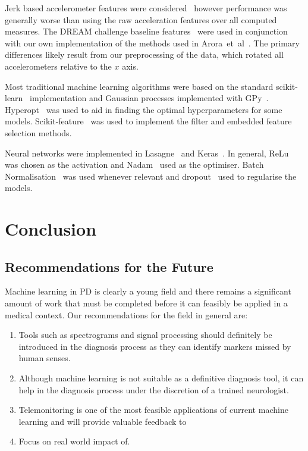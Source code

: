 \documentclass[12pt, twoside]{book}
\begin{document}
Jerk based accelerometer features were considered~\cite{jerkfeature} however performance was generally worse than using the raw acceleration features over all computed measures. The DREAM challenge baseline features~\cite{mpowertools} were used in conjunction with our own implementation of the methods used in Arora~et~al~\cite{arora2014high}. The primary differences likely result from our preprocessing of the data, which rotated all accelerometers relative to the $x$ axis.


Most traditional machine learning algorithms were based on the standard scikit-learn~\cite{scikitlearn} implementation and Gaussian processes implemented with GPy~\cite{gpy2014}. Hyperopt~\cite{hyperopt} was used to aid in finding the optimal hyperparameters for some models. Scikit-feature~\cite{skfeature} was used to implement the filter and embedded feature selection methods. 

Neural networks were implemented in Lasagne~\cite{lasagne} and Keras~\cite{keras}. In general, ReLu~\cite{relu} was chosen as the activation and Nadam~\cite{nadam} used as the optimiser. Batch Normalisation~\cite{batchnorm} was used whenever relevant and dropout~\cite{dropout} used to regularise the models. 



\chapter{Conclusion}



\section{Recommendations for the Future}
Machine learning in PD is clearly a young field and there remains a significant amount of work that must be completed before it can feasibly be applied in a medical context. Our recommendations for the field in general are:

\begin{enumerate}[noitemsep, topsep=-10pt]
	\item Tools such as spectrograms and signal processing should definitely be introduced in the diagnosis process as they can identify markers missed by human senses.
	\item Although machine learning is not suitable as a definitive diagnosis tool, it can help in the diagnosis process under the discretion of a trained neurologist.
	\item Telemonitoring is one of the most feasible applications of current machine learning and will provide valuable feedback to 
	\item Focus on real world impact of.
\end{enumerate}
\end{document}
